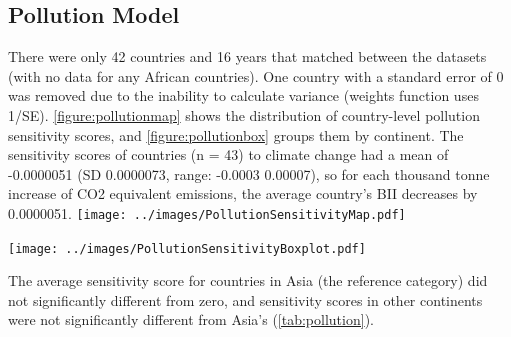 \documentclass[11pt, a4paper, titlepage]{article}
\begin{document}
	\newpage
	
	\subsection*{Pollution Model}
	
	There were only 42 countries and 16 years that matched between the datasets (with no data for any African countries). One country with a standard error of 0 was removed due to the inability to calculate variance (weights function uses 1/SE). \autoref{figure:pollutionmap} shows the distribution of country-level pollution sensitivity scores, and \autoref{figure:pollutionbox} groups them by continent. The sensitivity scores of countries (n = 43) to climate change had a mean of -0.0000051 (SD 0.0000073, range: -0.0003  0.00007), so for each thousand tonne increase of CO2 equivalent emissions, the average country's BII decreases by 0.0000051.\newline
	\texttt{[image: ../images/PollutionSensitivityMap.pdf]}
	\label{figure:pollutionmap}
	
	\texttt{[image: ../images/PollutionSensitivityBoxplot.pdf]}
	\label{figure:pollutionbox}
	
	The average sensitivity score for countries in Asia (the reference category) did not significantly different from zero, and sensitivity scores in other continents were not significantly different from Asia's (\autoref{tab:pollution}).
	
\end{document}
